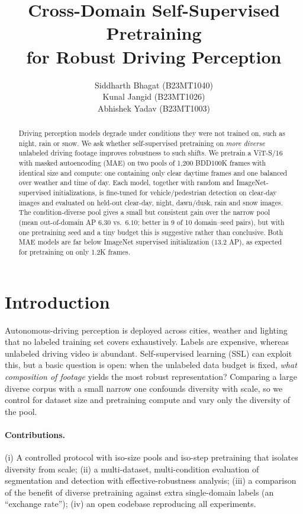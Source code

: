 \documentclass{article}
\title{Cross-Domain Self-Supervised Pretraining\\for Robust Driving Perception}
\author{%
  \normalfont\mdseries Siddharth Bhagat (B23MT1040) \\
  \normalfont\mdseries Kunal Jangid (B23MT1026) \\
  \normalfont\mdseries Abhishek Yadav (B23MT1003)
}
\begin{document}
\maketitle

\begin{abstract}
Driving perception models degrade under conditions they were not trained on, such as night, rain or snow.
We ask whether self-supervised pretraining on \emph{more diverse} unlabeled driving footage improves robustness to such
shifts. We pretrain a ViT-S/16 with masked autoencoding (MAE) on two pools of 1{,}200 BDD100K frames with identical size and
compute: one containing only clear daytime frames and one balanced over weather and time of day. Each model, together
with random and ImageNet-supervised initializations, is fine-tuned for vehicle/pedestrian detection on clear-day images
and evaluated on held-out clear-day, night, dawn/dusk, rain and snow images. The condition-diverse pool gives a small but
consistent gain over the narrow pool (mean out-of-domain AP $6.30$ vs.\ $6.10$; better in 9 of 10 domain--seed pairs), but
with one pretraining seed and a tiny budget this is suggestive rather than conclusive. Both MAE models are far below ImageNet
supervised initialization ($13.2$ AP), as expected for pretraining on only 1.2K frames.
\end{abstract}

\section{Introduction}
Autonomous-driving perception is deployed across cities, weather and lighting that no labeled training set covers
exhaustively. Labels are expensive, whereas unlabeled driving video is abundant. Self-supervised learning (SSL) can
exploit this, but a basic question is open: when the unlabeled data budget is fixed, \emph{what composition of
footage} yields the most robust representation? Comparing a large diverse corpus with a small narrow one confounds
diversity with scale, so we control for dataset size and pretraining compute and vary only the diversity of the pool.

\paragraph{Contributions.}
(i) A controlled protocol with iso-size pools and iso-step pretraining that isolates diversity from scale;
(ii) a multi-dataset, multi-condition evaluation of segmentation and detection with effective-robustness analysis;
(iii) a comparison of the benefit of diverse pretraining against extra single-domain labels (an ``exchange rate'');
(iv) an open codebase reproducing all experiments.
\end{document}
